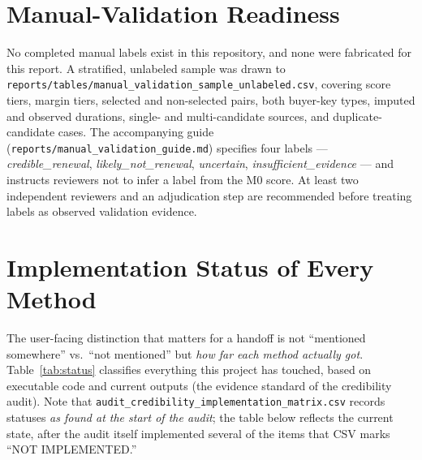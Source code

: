 \documentclass[11pt]{article}
\begin{document}
\section{Manual-Validation Readiness}
\label{sec:manual}
No completed manual labels exist in this repository, and none were
fabricated for this report. A stratified, unlabeled sample was drawn to
\texttt{reports/tables/manual\_validation\_sample\_unlabeled.csv}, covering
score tiers, margin tiers, selected and non-selected pairs, both buyer-key
types, imputed and observed durations, single- and multi-candidate sources,
and duplicate-candidate cases. The accompanying guide
(\texttt{reports/manual\_validation\_guide.md}) specifies four labels ---
\emph{credible\_renewal}, \emph{likely\_not\_renewal}, \emph{uncertain},
\emph{insufficient\_evidence} --- and instructs reviewers not to infer a
label from the M0 score. At least two independent reviewers and an
adjudication step are recommended before treating labels as observed
validation evidence.

\section{Implementation Status of Every Method}
\label{sec:status}
The user-facing distinction that matters for a handoff is not
``mentioned somewhere'' vs.\ ``not mentioned'' but \emph{how far each
method actually got}. Table~\ref{tab:status} classifies everything this
project has touched, based on executable code and current outputs (the
evidence standard of the credibility audit). Note that
\texttt{audit\_credibility\_implementation\_matrix.csv} records statuses
\emph{as found at the start of the audit}; the table below reflects the
current state, after the audit itself implemented several of the items that
CSV marks ``NOT IMPLEMENTED.''
\end{document}
